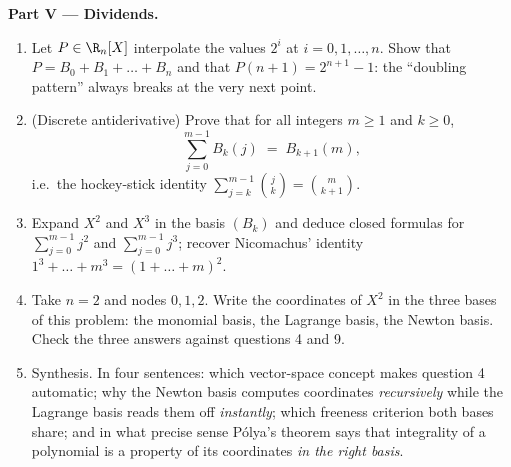 \begin{problem}
\medskip
\noindent\textbf{Part V --- Dividends.}
\begin{enumerate}[resume]
  \item Let $P \in \R_n[X]$ interpolate the values $2^i$ at $i =
        0, 1, \dots, n$. Show that $P = B_0 + B_1 + \dots + B_n$
        and that $P(n + 1) = 2^{n+1} - 1$: the ``doubling
        pattern'' always breaks at the very next point.
  \item (Discrete antiderivative) Prove that for all integers $m
        \geq 1$ and $k \geq 0$,
        \[
        \sum_{j=0}^{m-1} B_k(j) \;=\; B_{k+1}(m),
        \]
        i.e.\ the hockey-stick identity $\sum_{j=k}^{m-1}
        \binom{j}{k} = \binom{m}{k+1}$.
  \item Expand $X^2$ and $X^3$ in the basis $(B_k)$ and deduce
        closed formulas for $\sum_{j=0}^{m-1} j^2$ and
        $\sum_{j=0}^{m-1} j^3$; recover Nicomachus' identity
        $1^3 + \dots + m^3 = (1 + \dots + m)^2$.
  \item Take $n = 2$ and nodes $0, 1, 2$. Write the coordinates of
        $X^2$ in the three bases of this problem: the monomial
        basis, the Lagrange basis, the Newton basis. Check the
        three answers against questions 4 and 9.
  \item Synthesis. In four sentences: which vector-space concept
        makes question 4 automatic; why the Newton basis computes
        coordinates \emph{recursively} while the Lagrange basis
        reads them off \emph{instantly}; which freeness criterion
        both bases share; and in what precise sense P\'olya's
        theorem says that integrality of a polynomial is a
        property of its coordinates \emph{in the right basis}.
\end{enumerate}
\end{problem}
